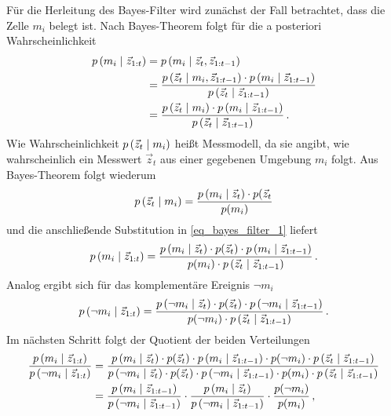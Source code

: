 Für die Herleitung des Bayes-Filter wird zunächst der Fall betrachtet, dass die Zelle $m_i$ belegt ist. Nach Bayes-Theorem folgt für die a posteriori Wahrscheinlichkeit
\begin{equation}
\label{eq_bayes_filter_1}
\begin{split}
\condP{m_i}{\vec{z}_{1:t}} &= \condP{m_i}{\vec{z}_t, \vec{z}_{1:t-1}} \\
&= \frac{\condP{\vec{z}_t}{m_i, \vec{z}_{1:t-1}}\cdot \condP{m_i}{\vec{z}_{1:t-1}}}{\condP{\vec{z}_t}{\vec{z}_{1:t-1}}} \\
&= \frac{\condP{\vec{z}_t}{m_i}\cdot \condP{m_i}{\vec{z}_{1:t-1}}}{\condP{\vec{z}_t}{\vec{z}_{1:t-1}}}\,.
\end{split}
\end{equation}
Wie Wahrscheinlichkeit $p\left({\vec{z}_t} \hspace{1mm} \vert \hspace{1mm} {m_i}\right)$ heißt Messmodell, da sie angibt, wie wahrscheinlich ein Messwert $\vec{z}_t$ aus einer gegebenen Umgebung $m_i$ folgt. Aus Bayes-Theorem folgt wiederum
\begin{equation}
p\left({\vec{z}_t} \hspace{1mm} \vert \hspace{1mm} {m_i}\right) = \frac{p\left({m_i} \hspace{1mm} \vert \hspace{1mm} {\vec{z}_t}\right)\cdot p(\vec{z}_t}{p(m_i)}
\end{equation}
und die anschließende Substitution in \ref{eq_bayes_filter_1} liefert
\begin{equation}
p\left({m_i} \hspace{1mm} \vert \hspace{1mm} {\vec{z}_{1:t}}\right) = \frac{p\left({m_i} \hspace{1mm} \vert \hspace{1mm} {\vec{z}_t}\right)\cdot p(\vec{z}_t) \cdot p\left({m_i} \hspace{1mm} \vert \hspace{1mm} {\vec{z}_{1:t-1}}\right)}{p(m_i)\cdot p\left({\vec{z}_t} \hspace{1mm} \vert \hspace{1mm} {\vec{z}_{1:t-1}}\right)}\,.
\end{equation}
Analog ergibt sich für das komplementäre Ereignis $\neg m_i$
\begin{equation}
p\left({\neg m_i} \hspace{1mm} \vert \hspace{1mm} {\vec{z}_{1:t}}\right) = \frac{p\left({\neg m_i} \hspace{1mm} \vert \hspace{1mm} {\vec{z}_t}\right)\cdot p(\vec{z}_t) \cdot p\left({\neg m_i} \hspace{1mm} \vert \hspace{1mm} {\vec{z}_{1:t-1}}\right)}{p(\neg m_i)\cdot p\left({\vec{z}_t} \hspace{1mm} \vert \hspace{1mm} {\vec{z}_{1:t-1}}\right)}\,.
\end{equation}
Im nächsten Schritt folgt der Quotient der beiden Verteilungen
\begin{equation}
\begin{split}
\frac{p\left({m_i} \hspace{1mm} \vert \hspace{1mm} {\vec{z}_{1:t}}\right)}{p\left({\neg m_i} \hspace{1mm} \vert \hspace{1mm} {\vec{z}_{1:t}}\right)} &= \frac{p\left({m_i} \hspace{1mm} \vert \hspace{1mm} {\vec{z}_t}\right)\cdot p(\vec{z}_t) \cdot p\left({m_i} \hspace{1mm} \vert \hspace{1mm} {\vec{z}_{1:t-1}}\right) \cdot p(\neg m_i)\cdot p\left({\vec{z}_t} \hspace{1mm} \vert \hspace{1mm} {\vec{z}_{1:t-1}}\right)}{p\left({\neg m_i} \hspace{1mm} \vert \hspace{1mm} {\vec{z}_t}\right)\cdot p(\vec{z}_t) \cdot p\left({\neg m_i} \hspace{1mm} \vert \hspace{1mm} {\vec{z}_{1:t-1}}\right) \cdot p(m_i)\cdot p\left({\vec{z}_t} \hspace{1mm} \vert \hspace{1mm} {\vec{z}_{1:t-1}}\right)} \\
&= \frac{p\left({m_i} \hspace{1mm} \vert \hspace{1mm} {\vec{z}_{1:t-1}}\right)}{p\left({\neg m_i} \hspace{1mm} \vert \hspace{1mm} {\vec{z}_{1:t-1}}\right)} \cdot
\frac{p\left({m_i} \hspace{1mm} \vert \hspace{1mm} {\vec{z}_t}\right)}{p\left({\neg m_i} \hspace{1mm} \vert \hspace{1mm} {\vec{z}_{1:t-1}}\right)}\cdot \frac{p(\neg m_i)}{p(m_i)}\,,
\end{split}
\end{equation}
